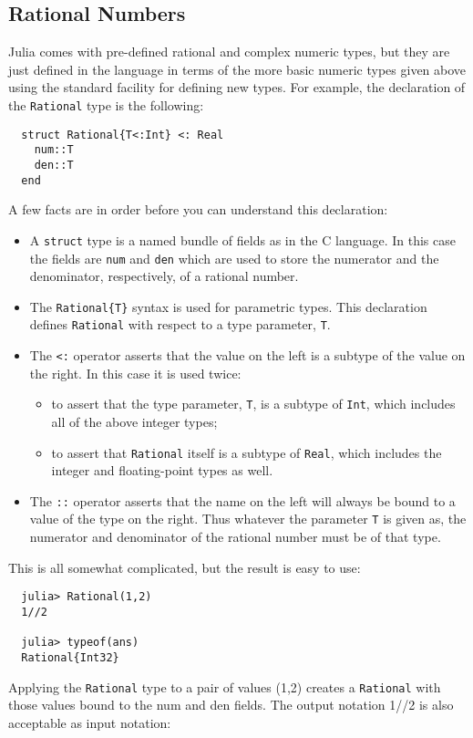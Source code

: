 \documentclass{article}
\begin{document}
\subsection{Rational Numbers}

Julia comes with pre-defined rational and complex numeric types, but they are just defined in the language in terms of the more basic numeric types given above using the standard facility for defining new types. For example, the declaration of the \verb|Rational| type is the following:
\begin{verbatim}
  struct Rational{T<:Int} <: Real
    num::T
    den::T
  end
\end{verbatim}
A few facts are in order before you can understand this declaration:
\begin{itemize}
\item A \verb|struct| type is a named bundle of fields as in the C language. In this case the fields are \verb|num| and \verb|den| which are used to store the numerator and the denominator, respectively, of a rational number.
\item The \verb|Rational{T}| syntax is used for parametric types. This declaration defines \verb|Rational| with respect to a type parameter, \verb|T|.
\item The \verb|<:| operator asserts that the value on the left is a subtype of the value on the right. In this case it is used twice:
  \begin{itemize}
    \item to assert that the type parameter, \verb|T|, is a subtype of \verb|Int|, which includes all of the above integer types;
    \item to assert that \verb|Rational| itself is a subtype of \verb|Real|, which includes the integer and floating-point types as well.
  \end{itemize}
\item The \verb|::| operator asserts that the name on the left will always be bound to a value of the type on the right. Thus whatever the parameter \verb|T| is given as, the numerator and denominator of the rational number must be of that type.
\end{itemize}
This is all somewhat complicated, but the result is easy to use:
\begin{verbatim}
  julia> Rational(1,2)
  1//2

  julia> typeof(ans)
  Rational{Int32}
\end{verbatim}
Applying the \verb|Rational| type to a pair of values (1,2) creates a \verb|Rational| with those values bound to the num and den fields. The output notation 1//2 is also acceptable as input notation:
\end{document}
